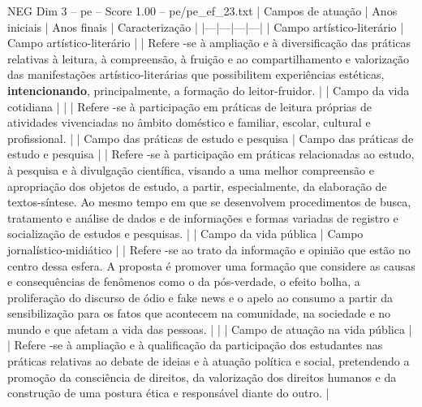 \begin{textsample}{NEG Dim 3 – pe – Score 1.00 – pe/pe\_ef\_23.txt}  \label{ex:f3_neg_009}
| Campos de atuação | Anos iniciais | Anos finais | Caracterização | |---|---|---|---| | Campo artístico-literário | Campo artístico-literário | | Refere -se à ampliação e à diversificação das práticas relativas à leitura, à compreensão, à fruição e ao compartilhamento e valorização das manifestações artístico-literárias que possibilitem experiências estéticas, \textbf{intencionando}, principalmente, a formação do leitor-fruidor. | | Campo da vida cotidiana | | | Refere -se à participação em práticas de leitura próprias de atividades vivenciadas no âmbito doméstico e familiar, escolar, cultural e profissional. | | Campo das práticas de estudo e pesquisa | Campo das práticas de estudo e pesquisa | | Refere -se à participação em práticas relacionadas ao estudo, à pesquisa e à divulgação científica, visando a uma melhor compreensão e apropriação dos objetos de estudo, a partir, especialmente, da elaboração de textos-síntese.
Ao mesmo tempo em que se desenvolvem procedimentos de busca, tratamento e análise de dados e de informações e formas variadas de registro e socialização de estudos e pesquisas. | | Campo da vida pública | Campo jornalístico-midiático | | Refere -se ao trato da informação e opinião que estão no centro dessa esfera.
A proposta é promover uma formação que considere as causas e consequências de fenômenos como o da pós-verdade, o efeito bolha, a proliferação do discurso de ódio e fake news e o apelo ao consumo a partir da sensibilização para os fatos que acontecem na comunidade, na sociedade e no mundo e que afetam a vida das pessoas. | | | Campo de atuação na vida pública | | Refere -se à ampliação e à qualificação da participação dos estudantes nas práticas relativas ao debate de ideias e à atuação política e social, pretendendo a promoção da consciência de direitos, da valorização dos direitos humanos e da construção de uma postura ética e responsável diante do outro. |

\end{textsample}
